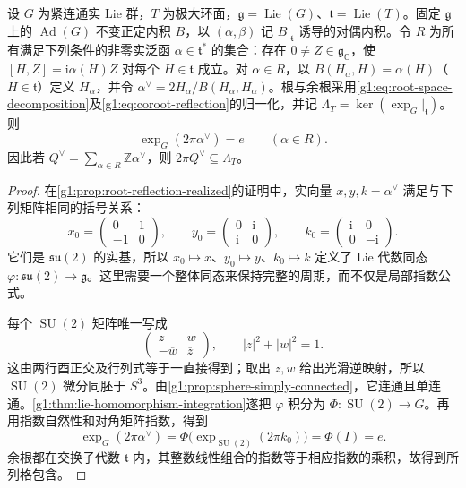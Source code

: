\begin{proposition}\label{g1:prop:coroot-period}
	设 \(G\) 为紧连通实 Lie 群，\(T\) 为极大环面，\(\mathfrak g=\operatorname{Lie}(G)\)、\(\mathfrak t=\operatorname{Lie}(T)\)。固定 \(\mathfrak g\) 上的 \(\operatorname{Ad}(G)\) 不变正定内积 \(B\)，以 \((\alpha,\beta)\) 记 \(B|_{\mathfrak t}\) 诱导的对偶内积。令 \(R\) 为所有满足下列条件的非零实泛函 \(\alpha\in\mathfrak t^*\) 的集合：存在 \(0\ne Z\in\mathfrak g_{\mathbb C}\)，使 \([H,Z]=\mathrm{i}\alpha(H)Z\) 对每个 \(H\in\mathfrak t\) 成立。对 \(\alpha\in R\)，以 \(B(H_\alpha,H)=\alpha(H)\)（\(H\in\mathfrak t\)）定义 \(H_\alpha\)，并令 \(\alpha^\vee=2H_\alpha/B(H_\alpha,H_\alpha)\)。根与余根采用\eqref{g1:eq:root-space-decomposition}及\eqref{g1:eq:coroot-reflection}的归一化，并记 \(\Lambda_T=\ker(\exp_G|_{\mathfrak t})\)。则
	\[
		\exp_G(2\pi\alpha^\vee)=e\qquad(\alpha\in R).
	\]
	因此若 \(Q^\vee=\sum_{\alpha\in R}\mathbb Z\alpha^\vee\)，则 \(2\pi Q^\vee\subseteq\Lambda_T\)。
\end{proposition}
\begin{proof}
	在\cref{g1:prop:root-reflection-realized}的证明中，实向量 \(x,y,k=\alpha^\vee\) 满足与下列矩阵相同的括号关系：
	\[
		x_0=\begin{pmatrix}0&1\\-1&0\end{pmatrix},\qquad
		y_0=\begin{pmatrix}0&\mathrm{i}\\\mathrm{i}&0\end{pmatrix},\qquad
		k_0=\begin{pmatrix}\mathrm{i}&0\\0&-\mathrm{i}\end{pmatrix}.
	\]
	它们是 \(\mathfrak{su}(2)\) 的实基，所以 \(x_0\mapsto x\)、\(y_0\mapsto y\)、\(k_0\mapsto k\) 定义了 Lie 代数同态 \(\varphi:\mathfrak{su}(2)\to\mathfrak g\)。这里需要一个整体同态来保持完整的周期，而不仅是局部指数公式。

	每个 \(\operatorname{SU}(2)\) 矩阵唯一写成
	\[
		\begin{pmatrix}z&w\\-\overline w&\overline z\end{pmatrix},
		\qquad |z|^2+|w|^2=1.
	\]
	这由两行酉正交及行列式等于一直接得到；取出 \(z,w\) 给出光滑逆映射，所以 \(\operatorname{SU}(2)\) 微分同胚于 \(S^3\)。由\cref{g1:prop:sphere-simply-connected}，它连通且单连通。\cref{g1:thm:lie-homomorphism-integration}遂把 \(\varphi\) 积分为 \(\Phi:\operatorname{SU}(2)\to G\)。再用指数自然性和对角矩阵指数，得到
	\[
		\exp_G(2\pi\alpha^\vee)
		=\Phi\bigl(\exp_{\operatorname{SU}(2)}(2\pi k_0)\bigr)
		=\Phi(I)=e.
	\]
	余根都在交换子代数 \(\mathfrak t\) 内，其整数线性组合的指数等于相应指数的乘积，故得到所列格包含。
\end{proof}

